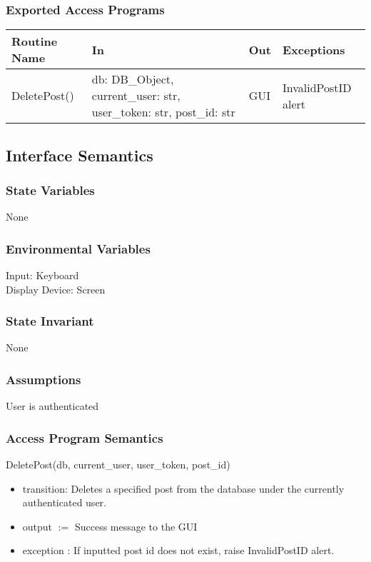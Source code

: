 \documentclass[12pt, titlepage]{article}
\begin{document}
\subsubsection* {Exported Access Programs}
\begin{table}[!htb]
    \centering
    \begin{tabular}{|p{3cm}|p{3cm}|p{3cm}|p{4.5cm}|}
        \hline
        \textbf{Routine Name} & \textbf{In} & \textbf{Out} & \textbf{Exceptions} \\
        \hline
         DeletePost() & db: DB\_Object, current\_user: str, user\_token: str, post\_id: str  & GUI & InvalidPostID alert\\
        \hline
    \end{tabular}
\end{table}

\subsection{Interface Semantics}
\subsubsection{State Variables}
None
\subsubsection{Environmental Variables}
Input: Keyboard\\
Display Device: Screen

\subsubsection{State Invariant}
None

\subsubsection{Assumptions}
User is authenticated

\subsubsection{Access Program Semantics}
DeletePost(db, current\_user, user\_token, post\_id)
\begin{itemize}
    \item transition: Deletes a specified post from the database under the currently authenticated user.
    \item output $:= $ Success message to the GUI
    \item exception : If inputted post id does not exist, raise InvalidPostID alert.
\end{itemize}
\end{document}
